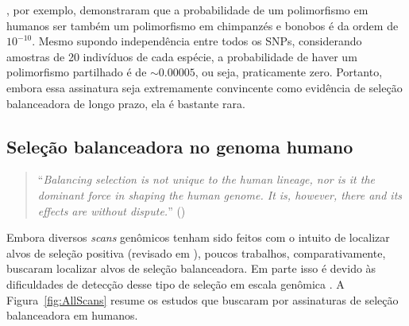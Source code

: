 \begin{refsection}
\textcite{Teixeira2015}, por exemplo, demonstraram que a probabilidade de um polimorfismo em humanos ser também um polimorfismo em chimpanzés e bonobos é da ordem de $10^{-10}$. Mesmo supondo independência entre todos os SNPs, considerando amostras de 20 indivíduos de cada espécie, a probabilidade de haver um polimorfismo partilhado é de $\sim 0.00005$, ou seja, praticamente zero. Portanto, embora essa assinatura seja extremamente convincente como evidência de seleção balanceadora de longo prazo, ela é bastante rara.  


% 

\subsection{Seleção balanceadora no genoma humano} %
\medskip
\begin{quotation}
\enquote{\emph{Balancing selection is not unique to the human lineage, nor is it the dominant force in shaping the human genome. It is, however, there and its effects are without dispute.}} (\cite{VallenderJohnson2008}) 
\end{quotation}
\medskip



  
Embora diversos \emph{scans} genômicos tenham sido feitos com o intuito de localizar alvos de seleção positiva (revisado em \cite{Akey2009}), poucos trabalhos, comparativamente, buscaram localizar alvos de seleção balanceadora. Em parte isso é devido às dificuldades de detecção desse tipo de seleção em escala genômica \parencite{Andres2009}. A Figura~\ref{fig:AllScans} resume os estudos que buscaram por assinaturas de seleção balanceadora em humanos.


\end{refsection}
